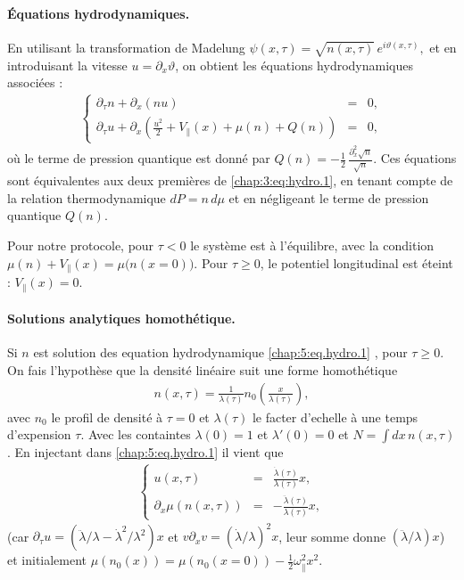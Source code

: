 \paragraph{Équations hydrodynamiques.}
En utilisant la transformation de Madelung 
\(
\psi(x,\tau) = \sqrt{n(x,\tau)} \, e^{i \vartheta(x,\tau)},
\)
et en introduisant la vitesse $u = \partial_x \vartheta$, on obtient les équations hydrodynamiques associées :
\begin{eqnarray}\label{chap:5:eq.hydro.1}
	\left\{
	\begin{array}{rcl}
		\partial_\tau n + \partial_x ( n u )	 & = & 0, \\[0.3em]
		\partial_\tau u + \partial_x \left( \tfrac{u^2}{2} + V_\parallel(x) + \mu(n) + Q(n) \right) & = & 0,
	\end{array} 
	\right.
\end{eqnarray}
où le terme de pression quantique est donné par
\(
Q(n) = - \frac{1}{2} \, \frac{\partial_x^2 \sqrt{n}}{\sqrt{n}}.
\)
Ces équations sont équivalentes aux deux premières de \eqref{chap:3:eq:hydro.1}, en tenant compte de la relation thermodynamique $dP = n \, d\mu$ et en négligeant le terme de pression quantique $Q(n)$.

\medskip

Pour notre protocole, pour $\tau < 0$ le système est à l’équilibre, avec la condition
\(
\mu(n) + V_\parallel(x) = \mu\bigl(n(x=0)\bigr).
\)
Pour $\tau \geq 0$, le potentiel longitudinal est éteint : $V_\parallel(x) = 0$.

\medskip

\paragraph{Solutions analytiques homothétique.}
Si $n$ est solution des equation hydrodynamique \eqref{chap:5:eq.hydro.1} , pour $\tau \geq 0$. On fais l'hypothèse que la densité linéaire suit une forme homothétique
\begin{eqnarray}
	n(x,\tau) = \frac{1}{\lambda(\tau)} n_0 \left ( \frac{x}{\lambda(\tau)} \right ) ,	
\end{eqnarray}
avec $n_0$ le profil de densité à $\tau = 0 $ et $\lambda(\tau)$ le facter d'echelle à une temps d'expension $\tau$. Avec les containtes $\lambda(0) = 1$ et $\lambda'(0) = 0$ et $N = \int dx \, n(x , \tau ) $. En injectant dans \eqref{chap:5:eq.hydro.1} il vient que 
\begin{eqnarray}\label{chap:5:eq.hydro.2}
	\left\{
	\begin{array}{rcl}
		u(x, \tau ) & = & \displaystyle \frac{\dot\lambda(\tau)}{\lambda(\tau)} x , \\[0.3em]
		\partial_x \mu ( n ( x , \tau ))  & = & - \displaystyle \frac{\ddot\lambda(\tau)}{\lambda(\tau)} x,
	\end{array} 
	\right.
\end{eqnarray}
(car \(\partial_\tau u=(\ddot\lambda/\lambda-\dot\lambda^2/\lambda^2)x\) et \(v\partial_x v=(\dot\lambda/\lambda)^2 x\), leur somme donne \((\ddot\lambda/\lambda)x\)) et initialement $\mu( n_0 ( x ) ) = \mu( n_0 ( x = 0  ) ) - \frac{1}{2} \omega_\parallel^2 x^2 $.

